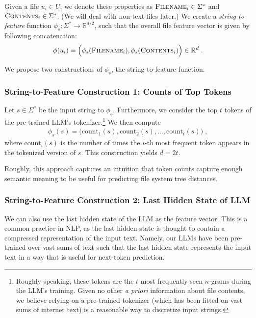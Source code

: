 \documentclass{article}
\begin{document}
Given a file $u_i \in U$, we denote these properties as $\textsc{Filename}_i \in \Sigma^*$ and $\textsc{Contents}_i \in \Sigma^*$. (We will deal with non-text files later.) We create a \emph{string-to-feature} function $\phi_s: \Sigma^* \to \mathbb R^{d/2}$, such that the overall file feature vector is given by following concatenation:
\begin{align}
  \phi(u_i) =
  \Big(\phi_s(\textsc{Filename}_i), \phi_s(\textsc{Contents}_i) \Big) \in \mathbb R^d \; .
\end{align}

We propose two constructions of $\phi_s$, the string-to-feature function.

\subsubsection{String-to-Feature Construction 1: Counts of Top Tokens}

Let $s \in \Sigma^*$ be the input string to $\phi_s$. Furthermore, we consider the top $t$ tokens of the pre-trained LLM's tokenizer.\footnote{Roughly speaking, these tokens are the $t$ most frequently seen $n$-grams during the LLM's training. Given no other \emph{a priori} information about file contents, we believe relying on a pre-trained tokenizer (which has been fitted on vast sums of internet text) is a reasonable way to discretize input strings.} We then compute
\begin{align}
  \phi_s(s) = \Big( \text{count}_1(s), \text{count}_2(s), \dots, \text{count}_t(s) \Big) \; ,
\end{align}
where $\text{count}_i(s)$ is the number of times the $i$-th most frequent token appears in the tokenized version of $s$. This construction yields $d = 2t$.

Roughly, this approach captures an intuition that token counts capture enough semantic meaning to be useful for predicting file system tree distances.

\subsubsection{String-to-Feature Construction 2: Last Hidden State of LLM}

We can also use the last hidden state of the LLM as the feature vector. This is a common practice in NLP, as the last hidden state is thought to contain a compressed representation of the input text. Namely, our LLMs have been pre-trained over vast sums of text such that the last hidden state represents the input text in a way that is useful for next-token prediction.
\end{document}
